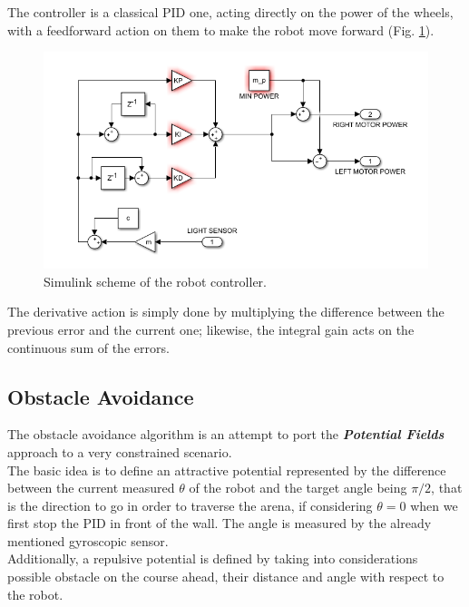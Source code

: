 \documentclass[a4paper,11pt,oneside]{book}
\begin{document}
			The controller is a classical PID one, acting directly on the power of the wheels, with a feedforward action on them to make the robot move forward (Fig. \ref{fig:PID_fig.png}).
			\begin{figure} [H]
				\includegraphics{figs/PID_fig.png}
				\caption{Simulink scheme of the robot controller.}\label{fig:PID_fig.png}
			\end{figure}
			
			The derivative action is simply done by multiplying the difference between the previous error and the current one; likewise, the integral gain acts on the continuous sum of the errors.\\
	
			
			
			
			
			\subsection {Obstacle Avoidance}
			
			The obstacle avoidance algorithm is an attempt to port the \textbf{\emph{Potential Fields}} approach to a very constrained scenario.\\
			The basic idea is to define an attractive potential represented by the difference between the current measured $\theta$ of the robot and the target angle being $\pi/2$, that is the direction to go in order to traverse the arena, if considering  $\theta=0$ when we first stop the PID in front of the wall. The angle is measured by the already mentioned gyroscopic sensor.\\
			Additionally, a repulsive potential is defined by taking into considerations possible obstacle on the course ahead, their distance and angle with respect to the robot.\\
			
\end{document}
